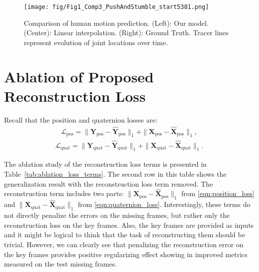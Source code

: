 \documentclass[letterpaper]{article} \usepackage[]{aaai23}  \usepackage{times}  \usepackage{helvet}  \usepackage{courier}  \usepackage[hyphens]{url}  \usepackage{graphicx} \urlstyle{rm} \def\UrlFont{\rm}  \usepackage{natbib}  \usepackage{caption} \frenchspacing  \setlength{\pdfpagewidth}{8.5in} \setlength{\pdfpageheight}{11in}
\renewcommand{\vec}[1]{\mathbf{#1}}
\begin{document}





\clearpage
\appendix



\begin{figure*}[t!]
    \centering
    \texttt{[image: fig/Fig1\_Comp3\_PushAndStumble\_start5381.png]}
    \caption{Comparison of human motion prediction. (Left): Our model. (Center): Linear interpolation. (Right): Ground Truth. Tracer lines represent evolution of joint locations over time.}
    \label{fig:bonus_pic}
\end{figure*}






\section{Ablation of Proposed Reconstruction Loss}
\label{ssec:ablation_of_reconstruction_loss}

Recall that the position and quaternion losses are:
\begin{align} \label{eqn:position_loss}
\mathcal{L}_{\textrm{pos}} = \| \vec{Y}_{\textrm{pos}} - \widehat{\vec{Y}}_{\textrm{pos}} \|_1 + \| \vec{X}_{\textrm{pos}} - \widehat{\vec{X}}_{\textrm{pos}} \|_1,
\end{align}
\begin{align} \label{eqn:quaternion_loss}
\mathcal{L}_{\textrm{quat}} = \| \vec{Y}_{\textrm{quat}} - \widehat{\vec{Y}}_{\textrm{quat}} \|_1 + \| \vec{X}_{\textrm{quat}} - \widehat{\vec{X}}_{\textrm{quat}} \|_1. 
\end{align}

The ablation study of the reconstruction loss terms is presented in Table~\ref{tab:ablation_loss_terms}. The second row in this table shows the generalization result with the reconstruction loss term removed. The reconstruction term includes two parts: $\| \vec{X}_{\textrm{pos}} - \widehat{\vec{X}}_{\textrm{pos}} \|_1$ from \eqref{eqn:position_loss} and $\| \vec{X}_{\textrm{quat}} - \widehat{\vec{X}}_{\textrm{quat}} \|_1$ from \eqref{eqn:quaternion_loss}. Interestingly, these terms do not directly penalize the errors on the missing frames, but rather only the reconstruction loss on the key frames. Also, the key frames are provided as inputs and it might be logical to think that the task of reconstructing them should be trivial. However, we can clearly see that penalizing the reconstruction error on the key frames provides positive regularizing effect showing in improved metrics measured on the test missing frames.
\end{document}
